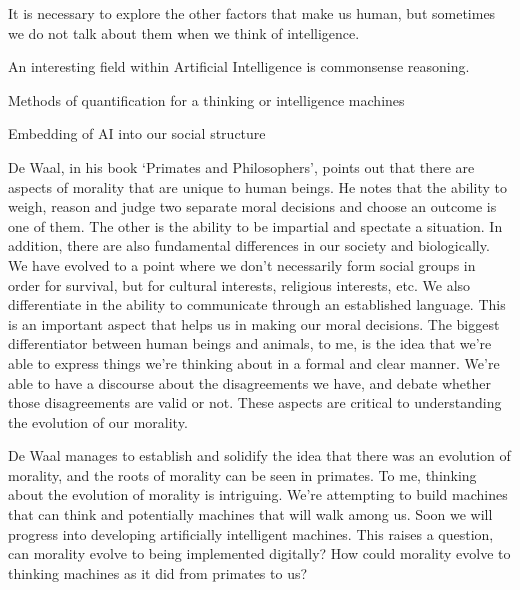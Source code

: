 \documentclass[11pt]{article}
\begin{document}
\par It is necessary to explore the other factors that make us human, but sometimes we do not talk about them when we think of intelligence. 

\par An interesting field within Artificial Intelligence is commonsense reasoning. 

\begin{center}
	{\large Methods of quantification for a thinking or intelligence machines\par}
\end{center}

\begin{center}
	{\large Embedding of AI into our social structure\par}
\end{center}

\par De Waal, in his book `Primates and Philosophers', points out that there are aspects of morality that are unique to human beings. He notes that the ability to weigh, reason and judge two separate moral decisions and choose an outcome is one of them. The other is the ability to be impartial and spectate a situation. In addition, there are also fundamental differences in our society and biologically. We have evolved to a point where we don't necessarily form social groups in order for survival, but for cultural interests, religious interests, etc. We also differentiate in the ability to communicate through an established language. This is an important aspect that helps us in making our moral decisions. The biggest differentiator between human beings and animals, to me, is the idea that we're able to express things we're thinking about in a formal and clear manner. We're able to have a discourse about the disagreements we have, and debate whether those disagreements are valid or not. These aspects are critical to understanding the evolution of our morality.

\par De Waal manages to establish and solidify the idea that there was an evolution of morality, and the roots of morality can be seen in primates. To me, thinking about the evolution of morality is intriguing. We're attempting to build machines that can think and potentially machines that will walk among us. Soon we will progress into developing artificially intelligent machines. This raises a question, can morality evolve to being implemented digitally? How could morality evolve to thinking machines as it did from primates to us?
\end{document}

